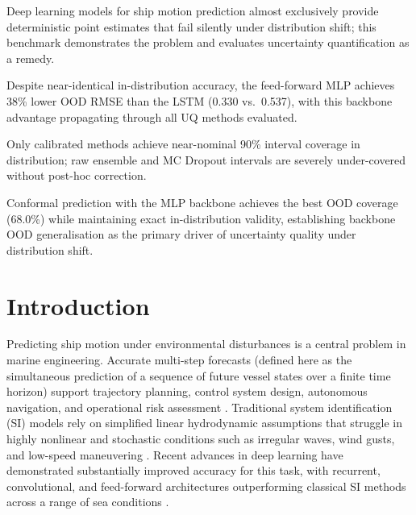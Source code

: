 \documentclass[a4paper,fleqn]{cas-sc}
\begin{document}
\begin{highlights}
\item Deep learning models for ship motion prediction almost exclusively provide deterministic point estimates that fail silently under distribution shift; this benchmark demonstrates the problem and evaluates uncertainty quantification as a remedy.
\item Despite near-identical in-distribution accuracy, the feed-forward MLP achieves 38\% lower OOD RMSE than the LSTM (0.330 vs.\ 0.537), with this backbone advantage propagating through all UQ methods evaluated.
\item Only calibrated methods achieve near-nominal 90\% interval coverage in distribution; raw ensemble and MC Dropout intervals are severely under-covered without post-hoc correction.
\item Conformal prediction with the MLP backbone achieves the best OOD coverage (68.0\%) while maintaining exact in-distribution validity, establishing backbone OOD generalisation as the primary driver of uncertainty quality under distribution shift.
\end{highlights}
\maketitle

\section{Introduction}

Predicting ship motion under environmental disturbances is a central problem in marine engineering. Accurate multi-step forecasts (defined here as the simultaneous prediction of a sequence of future vessel states over a finite time horizon) support trajectory planning, control system design, autonomous navigation, and operational risk assessment \cite{fossen2011handbook, silva2022ship, zhang2023deep, thombre2022autonomous}. Traditional system identification (SI) models rely on simplified linear hydrodynamic assumptions that struggle in highly nonlinear and stochastic conditions such as irregular waves, wind gusts, and low-speed maneuvering \cite{fossen2011handbook, schirmann2022datadriven}. Recent advances in deep learning have demonstrated substantially improved accuracy for this task, with recurrent, convolutional, and feed-forward architectures outperforming classical SI methods across a range of sea conditions \cite{silva2022ship, zhang2023deep, gong2025wavelet}.
\end{document}
